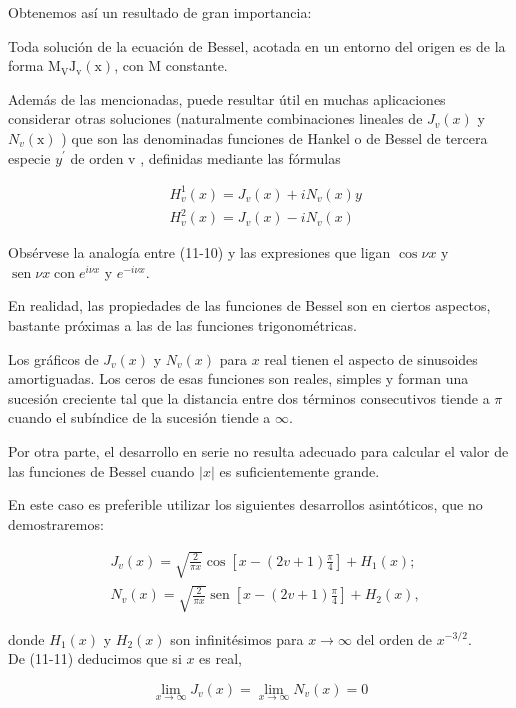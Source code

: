\documentclass[10pt]{article}
\theoremstyle{plain}
\theoremstyle{definition}
\theoremstyle{remark}
\begin{document}
Obtenemos así un resultado de gran importancia:

Toda solución de la ecuación de Bessel, acotada en un entorno del origen es de la forma $\mathrm{M}_{\mathrm{V}} \mathrm{J}_{\mathrm{v}}(\mathrm{x})$, con M constante.

Además de las mencionadas, puede resultar útil en muchas aplicaciones considerar otras soluciones (naturalmente combinaciones lineales de $J_{v}(x)$ y $N_{v}(\mathrm{x})$ ) que son las denominadas funciones de Hankel o de Bessel de tercera especie $y^{\prime}$ de orden v , definidas mediante las fórmulas


\begin{align*}
& H_{v}^{1}(x)=J_{v}(x)+i N_{v}(x) y  \tag{11-10}\\
& H_{v}^{2}(x)=J_{v}(x)-i N_{v}(x)
\end{align*}


Obsérvese la analogía entre (11-10) y las expresiones que ligan $\cos \nu x$ y $\operatorname{sen} \nu x \operatorname{con} e^{i \nu x}$ y $e^{-i \nu x}$.

En realidad, las propiedades de las funciones de Bessel son en ciertos aspectos, bastante próximas a las de las funciones trigonométricas.

Los gráficos de $J_{v}(x)$ y $N_{v}(x)$ para $x$ real tienen el aspecto de sinusoides amortiguadas. Los ceros de esas funciones son reales, simples y forman una sucesión creciente tal que la distancia entre dos términos consecutivos tiende a $\pi$ cuando el subíndice de la sucesión tiende a $\infty$.

Por otra parte, el desarrollo en serie no resulta adecuado para calcular el valor de las funciones de Bessel cuando $|x|$ es suficientemente grande.

En este caso es preferible utilizar los siguientes desarrollos asintóticos, que no demostraremos:


\begin{align*}
& J_{v}(x)=\sqrt{\frac{2}{\pi x}} \cos \left[x-(2 v+1) \frac{\pi}{4}\right]+H_{1}(x) ;  \tag{11-11}\\
& N_{v}(x)=\sqrt{\frac{2}{\pi x}} \operatorname{sen}\left[x-(2 v+1) \frac{\pi}{4}\right]+H_{2}(x),
\end{align*}


donde $H_{1}(x)$ y $H_{2}(x)$ son infinitésimos para $x \rightarrow \infty$ del orden de $x^{-3 / 2}$.\\
De (11-11) deducimos que si $x$ es real,

$$
\lim _{x \rightarrow \infty} J_{v}(x)=\lim _{x \rightarrow \infty} N_{v}(x)=0
$$
\end{document}
